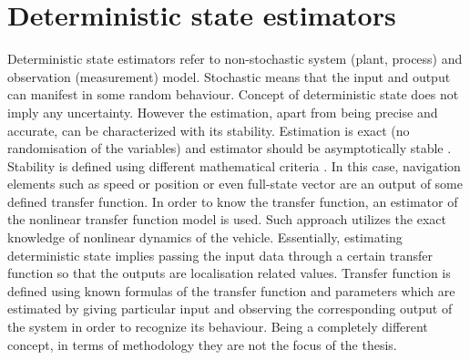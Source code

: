 \section{Deterministic state estimators}
Deterministic state estimators refer to non-stochastic system (plant, process) and observation (measurement) model. Stochastic means that the input and output can manifest in some random behaviour. Concept of deterministic state does not imply any uncertainty. However the estimation, apart from being precise and accurate, can be characterized with its stability. Estimation is exact (no randomisation of the variables) and estimator should be asymptotically stable \cite{kinsey07}. Stability is defined using different mathematical criteria \cite{kinsey07}. In this case, navigation elements such as speed or position or even full-state vector are an output of some defined transfer function. In order to know the transfer function, an estimator of the nonlinear transfer function model is used. Such approach utilizes the exact knowledge of nonlinear dynamics of the vehicle. Essentially, estimating deterministic state implies passing the input data through a certain transfer function so that the outputs are localisation related values. Transfer function is defined using known formulas of the transfer function and parameters which are estimated by giving particular input and observing the corresponding output of the system in order to recognize its behaviour. Being a completely different concept, in terms of methodology  they are not the focus of the thesis.
